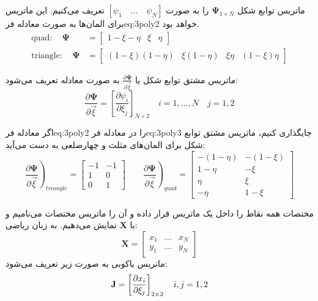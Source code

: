 ماتریس  توابع شکل
 $ \mathbf{\Psi}_{1 \times N} $
  را به صورت 
$\left[ \psi_1 \quad \ldots \quad \psi_N \right]$
تعریف می‌کنیم. این ماتریس برای المان‌ها به صورت معادله ‌فر{eq:3poly2} خواهد بود.
\begin{equation}
\label{eq:3poly2}
\begin{aligned}
\text{quad}: \quad  \mathbf \Psi &{}= 
	\begin{bmatrix}
	1-\xi-\eta &\xi &\eta
	\end{bmatrix} \\
\text{triangle}: \quad  \mathbf \Psi &{}=
	\begin{bmatrix}
	(1-\xi)(1-\eta) &\xi(1-\eta) &\xi\eta &(1-\xi)\eta 
	\end{bmatrix} 
\end{aligned}
\end{equation}

ماتریس مشتق توابع شکل یا 
$\frac{\partial \mathbf \Psi}{\partial \vec \xi}$
به صورت معادله تعریف می‌شود:
\begin{equation}
\label{eq:3poly3}
\frac{\partial \mathbf \Psi}{\partial \vec \xi} = 
\left[ \frac{\partial \psi_i}{\partial \xi_j} \right]_{N \times 2} 
\quad i = 1,\ldots,N \quad j=1,2
\end{equation}

اگر معادله ‌فر{eq:3poly2} را در معادله ‌فر{eq:3poly3} جایگذاری کنیم، ماتریس مشتق توابع شکل برای المان‌های مثلث و چهار‌ضلعی به دست می‌آید:
\begin{equation}
\label{eq:3poly4}
\left. \frac{\partial \mathbf \Psi}{\partial \vec \xi} \right)_{triangle} = 
	\begin{bmatrix}
	-1 &-1 \\ 1 &0 \\ 0 &1 
	\end{bmatrix} 
\qquad  \left. \frac{\partial \mathbf \Psi}{\partial \vec \xi} \right)_{quad}  =
	\begin{bmatrix}
	-(1-\eta) &-(1-\xi) \\ 1-\eta &-\xi \\ \eta &\xi \\ -\eta &1-\xi
	\end{bmatrix} 
\end{equation}

مختصات همه نقاط را داخل یک ماتریس قرار داده و آن را ماتریس مختصات می‌نامیم و با $\mathbf X$ نمایش می‌دهیم. به زبان ریاضی:
\begin{equation}
\label{eq:3poly5}
\mathbf X = 
	\begin{bmatrix}
	x_1 &\ldots &x_N \\ y_1 &\ldots &y_N
	\end{bmatrix} 
\end{equation}
ماتریس یاکوبی به صورت زیر تعریف می‌شود:
\begin{equation}
\label{eq:3poly6}
\textbf J = 
\left[ \frac{\partial x_i}{\partial \xi_j} \right]_{2 \times 2} \quad i,j = 1,2
\end{equation}

